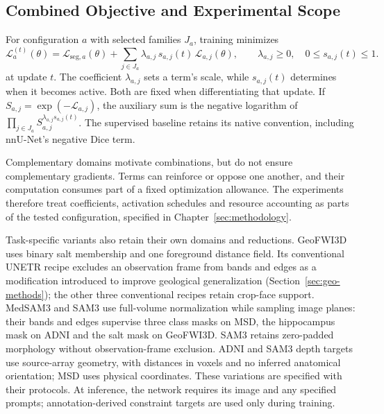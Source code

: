 \documentclass[12pt,a4paper]{article}
\begin{document}
\subsection{Combined Objective and Experimental Scope}
\label{sec:constraint-combination}

For configuration $a$ with selected families $J_a$, training minimizes
\begin{equation}
\mathcal{L}_{a}^{(t)}(\theta)
=\mathcal{L}_{\mathrm{seg},a}(\theta)
+\sum_{j\in J_a}\lambda_{a,j}\,s_{a,j}(t)\,
\mathcal{L}_{a,j}(\theta),
\qquad \lambda_{a,j}\geq0,\quad 0\leq s_{a,j}(t)\leq1.
\label{eq:scheduled-constraint-objective}
\end{equation}
at update $t$. The coefficient $\lambda_{a,j}$ sets a term's scale,
while $s_{a,j}(t)$ determines when it becomes active. Both are fixed
when differentiating that update. If
$S_{a,j}=\exp(-\mathcal L_{a,j})$, the auxiliary sum is the negative
logarithm of
$\prod_{j\in J_a}S_{a,j}^{\lambda_{a,j}s_{a,j}(t)}$.
The supervised baseline retains its native convention, including
nnU-Net's negative Dice term.

Complementary domains motivate combinations, but do not ensure
complementary gradients. Terms can reinforce or oppose one another,
and their computation consumes part of a fixed optimization allowance.
The experiments therefore treat coefficients, activation schedules
and resource accounting as parts of the tested configuration,
specified in Chapter~\ref{sec:methodology}.

Task-specific variants also retain their own domains and reductions.
GeoFWI3D uses binary salt membership and one foreground distance field.
Its conventional UNETR recipe excludes an observation frame from bands
and edges as a modification introduced to improve geological
generalization (Section~\ref{sec:geo-methods}); the other three
conventional recipes retain crop-face support. MedSAM3 and SAM3 use full-volume normalization while sampling
image planes: their bands and edges supervise three class masks on MSD,
the hippocampus mask on ADNI and the salt mask on GeoFWI3D. SAM3 retains
zero-padded morphology without observation-frame exclusion. ADNI and
SAM3 depth targets use source-array geometry, with distances in voxels
and no inferred anatomical orientation; MSD uses physical coordinates.
These variations are specified with their protocols. At inference, the
network requires its image and any specified prompts; annotation-derived
constraint targets are used only during training.
\end{document}
